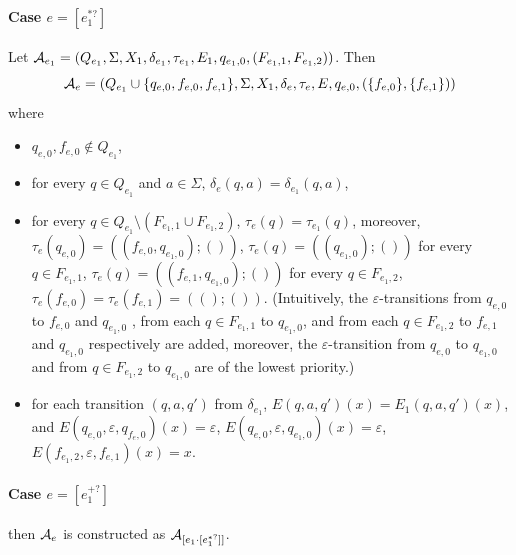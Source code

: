 \paragraph{Case $e = [e_1^{\ast?}]$} Let $\mathcal{A}_{e_1} = (Q_{e_1}, \Sigma, X_1, \delta_{e_1}, \tau_{e_1}, E_1, q_{e_1,0}, (F_{e_1,1}, F_{e_1,2}))$. 
Then 
\[\mathcal{A}_e = (Q_{e_1} \cup \{q_{e,0}, f_{e,0}, f_{e,1}\}, \Sigma, X_1, \delta_e, \tau_e, E, q_{e,0}, (\{f_{e,0}\}, \{f_{e,1}\}))\]  
where 
		\begin{itemize}
			\item $q_{e,0}, f_{e,0} \not \in Q_{e_1}$,
			
			\item for every $q \in Q_{e_1}$ and $a \in \Sigma$, $\delta_e(q, a) = \delta_{e_1}(q, a)$, 
			
			\item for every $q \in Q_{e_1} \setminus (F_{e_1,1} \cup F_{e_1,2})$,  $\tau_e(q) = \tau_{e_1}(q)$, moreover, $\tau_e(q_{e,0}) = ((f_{e,0}, q_{e_1,0}); ())$,  $\tau_e(q) = ((q_{e_1,0});())$ for every $q \in F_{e_1,1}$, $\tau_e(q) = ((f_{e,1}, q_{e_1,0});())$ for every $q \in F_{e_1,2}$, $\tau_e(f_{e,0}) =\tau_e(f_{e,1}) = (();())$. (Intuitively, the $\varepsilon$-transitions from $q_{e,0}$ to $f_{e,0}$ and $q_{e_1,0}$ , from each $q \in F_{e_1,1}$ to  $q_{e_1,0}$, and from each $q \in F_{e_1,2}$ to $f_{e,1}$ and $q_{e_1,0}$ respectively are added, moreover, the $\varepsilon$-transition from $q_{e,0}$ to $q_{e_1,0}$ and from $q \in F_{e_1,2}$ to $q_{e_1,0}$ are of the lowest priority.)
			
			\item for each transition $(q, a, q')$ from $\delta_{e_1}$, $E(q,a,q')(x) = E_1(q,a,q')(x)$, and $E(q_{e,0},\varepsilon,q_{f_e,0})(x) =\varepsilon$, $E(q_{e,0},\varepsilon,q_{e_1,0})(x) =\varepsilon$, $E(f_{e_1,2},\varepsilon,f_{e,1})(x) =x$.
		\end{itemize}

 
\paragraph{Case $e = [e_1^{+?}]$} then $\mathcal{A}_e$ is constructed as $\mathcal{A}_{[e_1 \cdot [e_1^{*?}]]}$.

